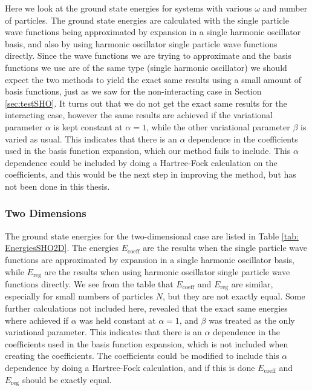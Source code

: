 \documentclass[../main.tex]{subfiles}
\begin{document}
Here we look at the ground state energies for systems with various $\omega$ and number of particles. The ground state energies are calculated with the single particle wave functions being approximated by expansion in a single harmonic oscillator basis, and also by using harmonic oscillator single particle wave functions directly. Since the wave functions we are trying to approximate and the basis functions we use are of the same type (single harmonic oscillator) we should expect the two methods to yield the exact same results using a small amount of basis functions, just as we saw for the non-interacting case in Section \ref{sec:testSHO}. It turns out that we do not get the exact same results for the interacting case, however the same results are achieved if the variational parameter $\alpha$ is kept constant at $\alpha = 1$, while the other variational parameter $\beta$ is varied as usual. This indicates that there is an $\alpha$ dependence in the coefficients used in the basis function expansion, which our method fails to include. This $\alpha$ dependence could be included by doing a Hartree-Fock calculation on the coefficients, and this would be the next step in improving the method, but has not been done in this thesis.

\subsubsection{Two Dimensions}

The ground state energies for the two-dimensional case are listed in Table \ref{tab: EnergiesSHO2D}. The energies $E_\textrm{coeff}$ are the results when the single particle wave functions are approximated by expansion in a single harmonic oscillator basis, while $E_\textrm{reg}$ are the results when using harmonic oscillator single particle wave functions directly. We see from the table that $E_\textrm{coeff}$ and $E_\textrm{reg}$ are similar, especially for small numbers of particles $N$, but they are not exactly equal. Some further calculations not included here, revealed that the exact same energies where achieved if $\alpha$ was held constant at $\alpha = 1$, and $\beta$ was treated as the only variational parameter. This indicates that there is an $\alpha$ dependence in the coefficients used in the basis function expansion, which is not included when creating the coefficients. The coefficients could be modified to include this $\alpha$ dependence by doing a Hartree-Fock calculation, and if this is done $E_\textrm{coeff}$ and $E_\textrm{reg}$ should be exactly equal. 
\end{document}
